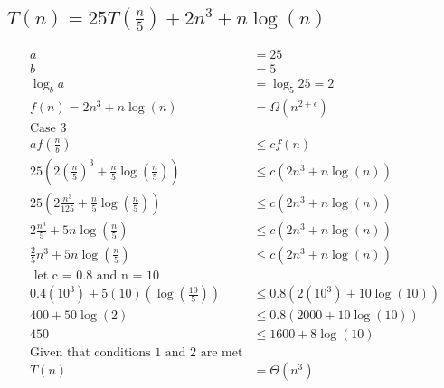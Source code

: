\documentclass{article}
\begin{document}
    \subsection{\(T(n) = 25T(\frac{n}{5}) + 2n^3 + n \log(n)\)}
      \begin{align*}
        a & = 25 \\
        b & = 5 \\
        \log_b{a} & = \log_5{25} = 2 \\
        f(n) = 2n^3 + n \log(n) & = \Omega(n^{2 + \epsilon}) \\
        \text{Case 3} \\
        af(\frac{n}{b}) & \leq cf(n) \\
        25(2(\frac{n}{5})^3 + \frac{n}{5} \log(\frac{n}{5})) & \leq c(2n^3 + n \log(n)) \\
        25(2 \frac{n^3}{125} + \frac{n}{5} \log(\frac{n}{5})) & \leq c(2n^3 + n \log(n)) \\
        2 \frac{n^3}{5} + 5n \log(\frac{n}{5}) & \leq c(2n^3 + n \log(n)) \\
        \frac{2}{5} n^3 + 5n \log(\frac{n}{5}) & \leq c(2n^3 + n \log(n)) \\
        \text { let c = 0.8 and n = 10} \\
        0.4(10^3) + 5(10)(\log(\frac{10}{5})) & \leq 0.8(2(10^3) + 10 \log(10)) \\
        400 + 50 \log(2) & \leq 0.8(2000 + 10 \log(10)) \\
        450 & \leq 1600 + 8 \log(10) \\
        \text{Given that conditions 1 and 2 are met} \\
        T(n) & = \Theta(n^3)
      \end{align*}
\end{document}
